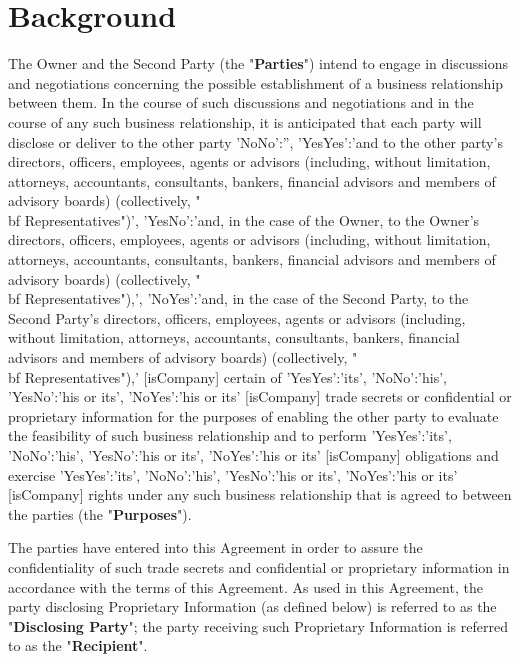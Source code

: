 \documentclass[12pt]{article}
\newcommand{\VAR}[1]{{\color{blue}#1}}
\newcommand{\pronouns}{
    \VAR{
        {
            'YesYes':'its',
            'NoNo':'his',
            'YesNo':'his or its',
            'NoYes':'his or its'
        }[isCompany]
    }
}
\begin{document}
\section{Background}
The Owner and the Second Party (the "{\bf Parties}") intend to engage in discussions and negotiations concerning the possible establishment of a business relationship between them.  In the course of such discussions and negotiations and in the course of any such business relationship, it is anticipated that each party will disclose or deliver to the other party
 \VAR{
    {
        'NoNo':'',
        'YesYes':'and to the other party’s directors, officers, employees, agents or advisors (including, without limitation, attorneys, accountants, consultants, bankers, financial advisors and members of advisory boards) (collectively, "{\\bf Representatives}")',
        'YesNo':'and, in the case of the Owner, to the Owner’s directors, officers, employees, agents or advisors (including, without limitation, attorneys, accountants, consultants, bankers, financial advisors and members of advisory boards) (collectively, "{\\bf Representatives}"),',
        'NoYes':'and, in the case of the Second Party, to the Second Party’s directors, officers, employees, agents or advisors (including, without limitation, attorneys, accountants, consultants, bankers, financial advisors and members of advisory boards) (collectively, "{\\bf Representatives}"),'
    }[isCompany]
}
certain of \pronouns trade secrets or confidential or proprietary information for the purposes of enabling the other party to evaluate the feasibility of such business relationship and to perform \pronouns obligations and exercise \pronouns rights under any such business relationship that is agreed to between the parties (the "{\bf Purposes}").

The parties have entered into this Agreement in order to assure the confidentiality of such trade secrets and confidential or proprietary information in accordance with the terms of this Agreement.  As used in this Agreement, the party disclosing Proprietary Information (as defined below) is referred to as the "{\bf Disclosing Party}"; the party receiving such Proprietary Information is referred to as the "{\bf Recipient}".
\end{document}
